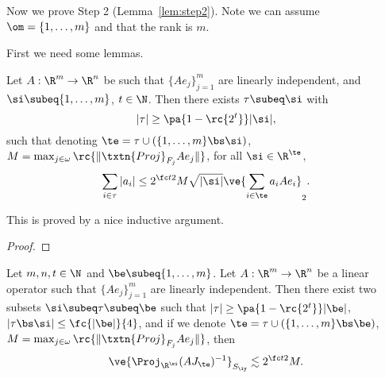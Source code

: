 
Now we prove Step 2 (Lemma~\ref{lem:step2}). Note we can assume $\om=\{1,\ldots, m\}$ and that the rank is $m$.

First we need some lemmas.
\begin{lem}
Let $A:\R^m\to \R^n$ be such that $\{Ae_j\}_{j=1}^m$ are linearly independent, and $\si\subeq \{1,\ldots, m\}$, $t\in \N$. Then there exists $\tau\subeq \si$ with 
\[
|\tau|\ge \pa{1-\rc{2^t}}|\si|,
\]
such that denoting $\te = \tau\cup (\{1,\ldots, m\}\bs \si)$, $M=\max_{j \in \omega} \rc{{\|\txtn{Proj}_{F_j} Ae_j\|}}$, for all $\si\in \R^{\te}$,
\[
\sum_{i\in \tau}|a_i|\le 2^{\fc t2} M \sqrt{|\si|} \ve{\sum_{i\in \te} a_iAe_i}_2.
\]
\end{lem}


This is proved by a nice inductive argument.
\begin{proof}

\end{proof}
\begin{lem}
Let $m,n,t\in \N$ and $\be\subeq \{1,\ldots, m\}$. Let $A:\R^m\to \R^n$ be a linear operator such that $\{Ae_j\}_{j=1}^m$ are linearly independent. Then there exist two subsets
$
\si \subeq \tau \subeq \be
$
such that
$|\tau|\ge \pa{1-\rc{2^t}}|\be|$,  
$|\tau\bs \si| \le \fc{|\be|}{4}$,
and if we denote $\te=\tau\cup (\{1,\ldots, m\}\bs \be)$, $M=\max_{j \in \omega} \rc{{\|\txtn{Proj}_{F_j} Ae_j\|}}$, then 
\[
\ve{\Proj_{\R^{\si}}(AJ_{\te})^{-1}}_{S_{\iy}}\lesssim 2^{\fc t2}M.
\]
\end{lem}


